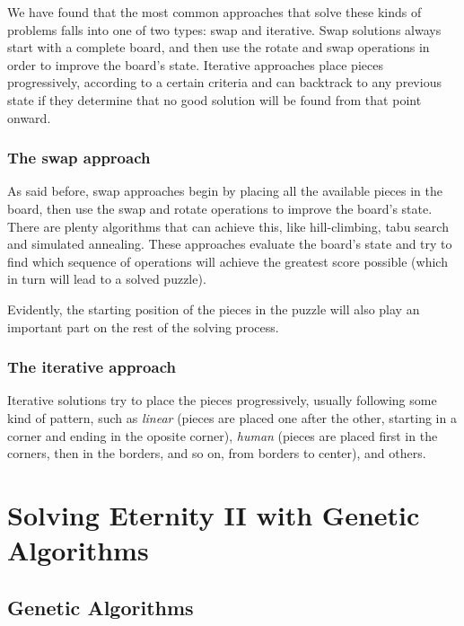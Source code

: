 \documentclass{llncs}
\begin{document}
We have found that the most common approaches that solve these kinds of problems falls into one of two types: swap and iterative. Swap solutions always start with a complete board, and then use the rotate and swap operations in order to improve the board's state. Iterative approaches place pieces progressively, according to a certain criteria and can backtrack to any previous state if they determine that no good solution will be found from that point onward.

\subsubsection{The swap approach}\label{sec:swap_approach}

As said before, swap approaches begin by placing all the available pieces in the board, then use the swap and rotate operations to improve the board's state. There are plenty algorithms that can achieve this, like hill-climbing, tabu search and simulated annealing. These approaches evaluate the board's state and try to find which sequence of operations will achieve the greatest score possible (which in turn will lead to a solved puzzle).

Evidently, the starting position of the pieces in the puzzle will also play an important part on the rest of the solving process.

\subsubsection{The iterative approach}\label{sec:iterative_approach}

Iterative solutions try to place the pieces progressively, usually following some kind of pattern, such as \textit{linear} (pieces are placed one after the other, starting in a corner and ending in the oposite corner), \textit{human} (pieces are placed first in the corners, then in the borders, and so on, from borders to center), and others.

\section{Solving Eternity II with Genetic Algorithms}\label{sec:genetic_algorithms}

\subsection{Genetic Algorithms}

\end{document}
